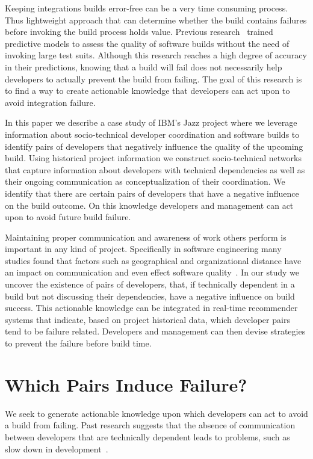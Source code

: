 \documentclass[conference]{IEEEtran}
\begin{document}
Keeping integrations builds error-free can be a very time consuming
process. 
Thus lightweight approach that can determine whether the build contains
failures before invoking the build process holds value. Previous
research~\cite{wolf:icse:2009,hassan:ase:2006} trained predictive models to assess the quality of software builds without the need of invoking large test
suits. Although this research
reaches a high degree of accuracy in their predictions, knowing that a
build will fail does not necessarily help developers to actually prevent
the build from failing.
The goal of this research is to find a way to create actionable knowledge that
developers can act upon to avoid
integration failure.

In this paper we describe a case study of IBM's Jazz project where we leverage
information about socio-technical developer coordination and software builds to
identify pairs of developers that negatively influence the quality of the
upcoming build. Using historical project information we construct socio-technical
networks that capture information about developers with technical dependencies
as well as their ongoing communication as conceptualization of their coordination.
We identify that there are certain pairs of developers that have a
negative influence on the build outcome. On this knowledge developers and management can
act upon to avoid future build failure.

Maintaining proper communication and awareness of work others perform is
important in any kind of project. Specifically in software engineering many studies found
that factors such as geographical and organizational distance have an impact on
communication and even effect software quality~\cite{nagappan:icse:2008}. In our
study we uncover the existence of pairs of
developers, that, if technically dependent in a build but not discussing their
dependencies, have a negative influence on build success. This
actionable knowledge can be integrated in real-time recommender systems that
indicate, based on project historical data, which developer pairs tend to be
failure related. Developers and management can then devise strategies to
prevent the failure before build time. 



\section{Which Pairs Induce Failure?}
\label{sec:pattern}
We seek to generate actionable knowledge upon which developers can act to
avoid a build from failing. Past research suggests that the absence of
communication between developers that are technically dependent leads to
problems, such as slow down in development~\cite{cataldo:esem:2008}.
\end{document}
